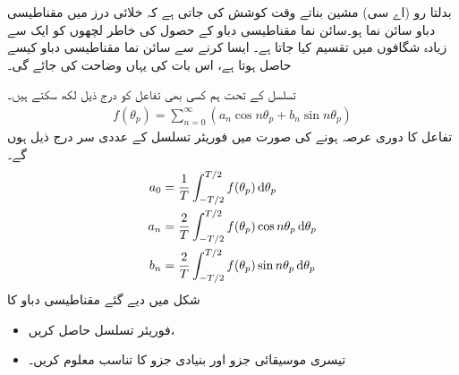 بدلتا رو (اے سی) مشین بناتے وقت  کوشش کی جاتی ہے کہ خلائی درز میں مقناطیسی دباو سائن نما ہو۔سائن نما مقناطیسی دباو کے حصول  کی خاطر لچھوں کو ایک سے زیادہ شگافوں میں تقسیم کیا جاتا ہے۔ ایسا کرنے سے سائن نما مقناطیسی دباو کیسے حاصل ہوتا ہے، اس بات کی  یہاں وضاحت کی جائے گی۔

 تسلسل کے تحت ہم کسی بھی تفاعل   کو درج ذیل  لکھ سکتے ہیں۔
\begin{align}
f(\theta_p)=\sum_{n=0}^{\infty} (a_n \cos n \theta_p +b_n \sin n \theta_p)
\end{align}
تفاعل کا دوری عرصہ  ہونے کی صورت میں فوریئر تسلسل کے عددی سر درج ذیل ہوں گے۔
\begin{gather}
\begin{aligned}\label{مساوات_گھومتے_مشین_فورئر_تسلسل_جزو}
a_0&=\frac{1}{T} \int_{-T/2}^{T/2} f(\theta_p) \dif \theta_p\\
a_n&=\frac{2}{T} \int_{-T/2}^{T/2} f(\theta_p) \cos n \theta_p \dif \theta_p\\
b_n&=\frac{2}{T} \int_{-T/2}^{T/2} f(\theta_p) \sin n \theta_p \dif \theta_p
\end{aligned}
\end{gather}
%
شکل   میں دیے گئے مقناطیسی دباو کا
\begin{itemize}
\item
فوریئر تسلسل حاصل کریں،
\item
تیسری موسیقائی جزو اور بنیادی جزو کا تناسب معلوم کریں۔
\end{itemize}

